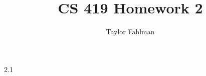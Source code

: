 \documentclass{article}
\begin{document}
\title{CS 419 Homework 2}
\author{Taylor Fahlman}
\maketitle
\begin{flushleft}
2.1\\
\end{flushleft}
\end{document}
